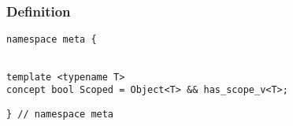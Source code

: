 
\subsubsection{Definition}

\begin{verbatim}
namespace meta {
\end{verbatim}
\begin{verbatim}

template <typename T>
concept bool Scoped = Object<T> && has_scope_v<T>;

\end{verbatim}
\begin{verbatim}
} // namespace meta
\end{verbatim}
